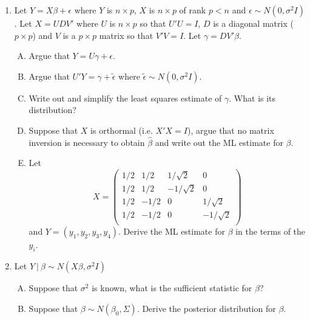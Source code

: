 \documentclass[12pt]{article}
\begin{document}
\begin{enumerate}[1.]

\item Let $Y = X\beta + \epsilon$ where $Y$ is $n\times p$, $X$ is $n\times p$ of rank $p < n$ and $\epsilon \sim N(0, \sigma^2 I)$.
  Let $X = U D V'$ where $U$ is $n\times p$ so that $U' U = I$, $D$ is a diagonal matrix ($p\times p$) and
  $V$ is a $p\times p$ matrix so that $V'V = I$. Let $\gamma = D V' \beta$.
  \begin{enumerate}[A.]
  \item Argue that $Y = U \gamma + \epsilon$.
  \item Argue that $U'Y = \gamma + \tilde \epsilon$ where $\tilde \epsilon \sim N(0, \sigma^2 I)$. 
  \item Write out and simplify  the least squares estimate of $\gamma$. What is its distribution?
  \item Suppose that $X$ is orthormal (i.e. $X' X = I$), argue that no matrix inversion is necessary to obtain $\hat \beta$ and write out
  	the ML estimate for $\beta$.
  \item Let 
$$
X = \left(
\begin{array}{rrrr}
1/2 & 1/2 &  1/\sqrt{2} & 0\\
1/2 & 1/2 & -1/\sqrt{2} & 0\\
1/2 & -1/2 & 0   & 1/\sqrt{2}\\
1/2 & -1/2 & 0   & -1/\sqrt{2}\\
\end{array}
\right)
$$
and $Y = (y_1,y_2,y_3,y_4)$. Derive the ML estimate for $\beta$ in the terms of the $y_i$. 
  \end{enumerate}

\newpage

\item Let $Y ~|~ \beta \sim N(X \beta, \sigma^2 I)$
  \begin{enumerate}[A.]
  \item Suppose that $\sigma^2$ is known, what is the sufficient statistic for $\beta$?
  \item Suppose that $\beta \sim N(\beta_0, \Sigma)$. Derive the posterior
  distribution for $\beta$.
  \end{enumerate}

\newpage


\end{enumerate}
\end{document}
